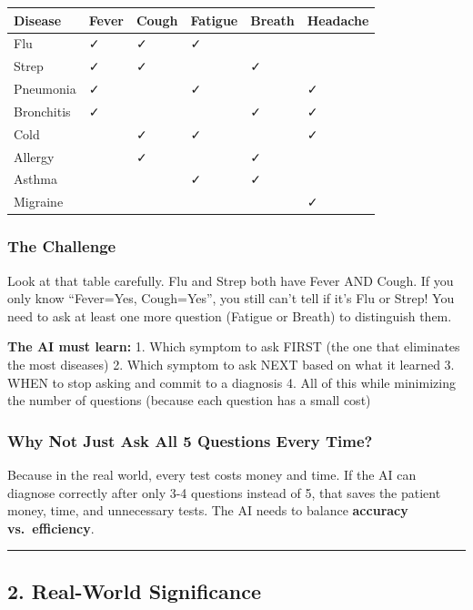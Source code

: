 \documentclass[
]{article}
\begin{document}
\begin{longtable}[]{@{}llllll@{}}
\toprule
Disease & Fever & Cough & Fatigue & Breath & Headache \\
\midrule
\endhead
Flu & ✓ & ✓ & ✓ & & \\
Strep & ✓ & ✓ & & ✓ & \\
Pneumonia & ✓ & & ✓ & & ✓ \\
Bronchitis & ✓ & & & ✓ & ✓ \\
Cold & & ✓ & ✓ & & ✓ \\
Allergy & & ✓ & & ✓ & \\
Asthma & & & ✓ & ✓ & \\
Migraine & & & & & ✓ \\
\bottomrule
\end{longtable}

\hypertarget{the-challenge}{%
\subsubsection{The Challenge}\label{the-challenge}}

Look at that table carefully. Flu and Strep both have Fever AND Cough.
If you only know ``Fever=Yes, Cough=Yes'', you still can't tell if it's
Flu or Strep! You need to ask at least one more question (Fatigue or
Breath) to distinguish them.

\textbf{The AI must learn:} 1. Which symptom to ask FIRST (the one that
eliminates the most diseases) 2. Which symptom to ask NEXT based on what
it learned 3. WHEN to stop asking and commit to a diagnosis 4. All of
this while minimizing the number of questions (because each question has
a small cost)

\hypertarget{why-not-just-ask-all-5-questions-every-time}{%
\subsubsection{Why Not Just Ask All 5 Questions Every
Time?}\label{why-not-just-ask-all-5-questions-every-time}}

Because in the real world, every test costs money and time. If the AI
can diagnose correctly after only 3-4 questions instead of 5, that saves
the patient money, time, and unnecessary tests. The AI needs to balance
\textbf{accuracy vs.~efficiency}.

\begin{center}\rule{0.5\linewidth}{0.5pt}\end{center}

\hypertarget{real-world-significance}{%
\subsection{2. Real-World Significance}\label{real-world-significance}}
\end{document}
